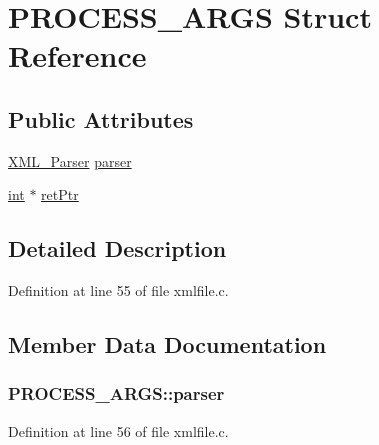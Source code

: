 \hypertarget{struct_p_r_o_c_e_s_s___a_r_g_s}{}\section{P\+R\+O\+C\+E\+S\+S\+\_\+\+A\+R\+GS Struct Reference}
\label{struct_p_r_o_c_e_s_s___a_r_g_s}
\subsection*{Public Attributes}
\begin{DoxyCompactItemize}
\item 
\hyperlink{amiga_2include_2libraries_2expat_8h_a9dc0003156857c67b3a60b3993846013}{X\+M\+L\+\_\+\+Parser} \hyperlink{struct_p_r_o_c_e_s_s___a_r_g_s_aeb32c17cbc7fa323bc41c3800ea96667}{parser}
\item 
\hyperlink{xmltok_8h_a5a0d4a5641ce434f1d23533f2b2e6653}{int} $\ast$ \hyperlink{struct_p_r_o_c_e_s_s___a_r_g_s_a47fc3d5e09769e957a91f3ff72accba2}{ret\+Ptr}
\end{DoxyCompactItemize}


\subsection{Detailed Description}


Definition at line 55 of file xmlfile.\+c.



\subsection{Member Data Documentation}
\subsubsection[{\texorpdfstring{parser}{parser}}]{ P\+R\+O\+C\+E\+S\+S\+\_\+\+A\+R\+G\+S\+::parser}\hypertarget{struct_p_r_o_c_e_s_s___a_r_g_s_aeb32c17cbc7fa323bc41c3800ea96667}{}\label{struct_p_r_o_c_e_s_s___a_r_g_s_aeb32c17cbc7fa323bc41c3800ea96667}


Definition at line 56 of file xmlfile.\+c.

